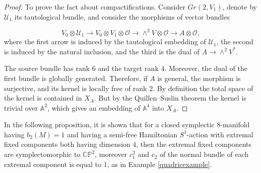 \documentclass[12pt]{article}
\begin{document}
\begin{proof}
To prove the fact about compactifications. Consider $Gr(2,V_1)$, denote by $\mathcal{U}_1$
its tautological bundle, and consider the morphisms of vector bundles

$$V_0 \otimes \mathcal{U}_1 \to V_0 \otimes V_1 \otimes \mathcal{O} \to \wedge^2V \otimes \mathcal{O}
\to A \otimes \mathcal{O},$$ where the first arrow is induced by the tautological embedding of $\mathcal{U}_1$,
the second is induced by the natural inclusion, and the third is the dual of $A \to \wedge^2V^*$.

The source bundle has rank $6$ and the target rank $4$. Moreover, the dual
of the first bundle is globally generated. Therefore, if $A$ is general,
the morphism is surjective, and its kernel is locally free of rank $2$.
By definition the total space of the kernel is contained in $X_A$.
But by the Quillen–Suslin theorem the kernel is trivial over $\mathbb{A}^2$,
which gives an embedding of $\mathbb{A}^4$ into $X_A$.
\end{proof}


In the following proposition, it is shown that for a closed symplectic $8$-manifold having $b_{2}(M)=1$ and having a semi-free Hamiltonian $S^1$-action with extremal fixed components  both having dimension $4$, then the extremal fixed components are symplectomorphic to $\mathbb{CP}^2$, moreover $c_1^2$ and $c_2$ of the normal bundle of each extremal component is equal to $1$, as in Example \ref{quadricexample}.
\end{document}
